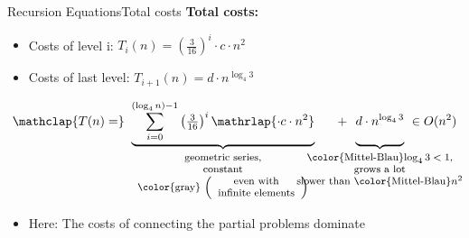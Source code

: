 
\begin{frame}{Recursion Equations}{Total costs}
  \textbf{Total costs:}
  \begin{itemize}
    \item<2->
      Costs of {\color{Mittel-Blau}level i}:
      $T_i(n) = \left(\frac{3}{16}\right)^i \cdot c \cdot n^2$
    \item<3->
      Costs of {\color{Mittel-Blau}last level}:
      $T_{i+1}(n) = d \cdot n^{\log_4 3}$
  \end{itemize}
  \vspace{0.5em}
  \begin{displaymath}
    \mathclap{T(n) =}\underbrace{
      \sum\limits_{i = 0}^{(\log_4 n) - 1} \left(\tfrac{3}{16}\right)^i
      \mathrlap{\cdot c \cdot n^2}
    }_{
      \text{
        \footnotesize
        \begin{tabular}{c}
          geometric series,\\
          constant\\
          \color{gray}
          $\left(\begin{array}{c}
            \text{even with}\\
            \text{infinite elements}
          \end{array}\right)$
        \end{tabular}
      }
    } \hspace{1.25em} + \hspace{0.5em} \underbrace{
      d \cdot n^{\log_4 3}
      \vphantom{\sum\limits_{i = 0}^{(\log_4 n) - 1}}
    }_{
      \text{
        \makebox[0pt][c]{
          \footnotesize
          \begin{tabular}{c}
            {\color{Mittel-Blau}$\log_4 3 < 1$},\\
            grows a lot\\
            slower than {\color{Mittel-Blau}$n^2$}
          \end{tabular}
        }
      }
    } ~ \in O(n^2)
  \end{displaymath}
  \begin{itemize}
    \item<5->
      Here: The costs of connecting the partial problems dominate
  \end{itemize}
\end{frame}



